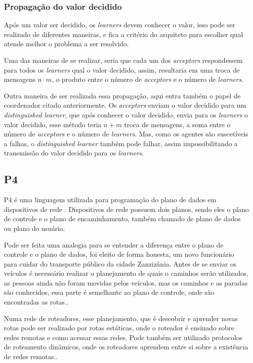 \documentclass[12pt,
openright, 
oneside,
a4paper,
brazil]{facom-ufu-abntex2}
\theoremstyle{definition}
\begin{document}
\subsubsection{Propagação do valor decidido}
Após um valor ser decidido, os \textit{learners} devem conhecer o valor, isso pode ser realizado
de diferentes maneiras, e fica a critério do arquiteto para escolher qual atende melhor o
problema a ser resolvido.

Uma das maneiras de se realizar, seria que cada um dos \textit{acceptors} respondessem para
todos os \textit{learners} qual o valor decidido, assim, resultaria em uma troca de mensagens
$n \cdot m$, o produto entre o número de \textit{acceptors} e o número de \textit{learners}.

Outra maneira de ser realizada essa propagação, aqui entra também o papel de coordenador
citado anteriormente. Os \textit{acceptors} enviam o valor decidido para um
\textit{distinguished learner}, que após conhecer o valor decidido, envia para os
\textit{learners} o valor decidido, esse método teria $n + m$ troca de mensagens,
a soma entre o número de \textit{acceptors} e o número de \textit{learners}. Mas, como os
agentes são suscetíveis a falhas, o \textit{distinguished learner} também pode falhar,
assim impossibilitando a transmissão do valor decidido para os \textit{learners}.

\subsection{P4}
P4 é uma linguagem utilizada para programação do plano de dados em  dispositivos de 
rede \citep{paxos16spec}. Dispositivos de rede possuem dois planos, sendo eles o 
plano de controle e o plano de encaminhamento, também chamado de plano de dados ou 
plano do usuário. 

Pode ser feita uma analogia para se entender a diferença entre o 
plano de controle e o plano de dados, foi eleito de forma honesta, um novo 
funcionário para cuidar do transporte público 
da cidade Zanzizânia. Antes de se enviar os veículos é necessário realizar o 
planejamento de quais o caminhos serão utilizados, as pessoas ainda não foram 
movidas pelos veículos, mas os caminhos e as paradas são conhecidos, essa parte é 
semelhante ao plano de controle, onde são encontradas as rotas.\citep{dataVsControl}.

Numa rede de roteadores, esse planejamento, que é descobrir e aprender novas rotas 
pode ser realizado por rotas estáticas, onde o roteador é ensinado sobre redes remotas
e como acessar essas redes. Pode também ser utilizado protocolos de roteamento dinâmicos,
onde os roteadores aprendem entre si sobre a existência de redes remotas.\citep{dataVsControl}.
\end{document}
